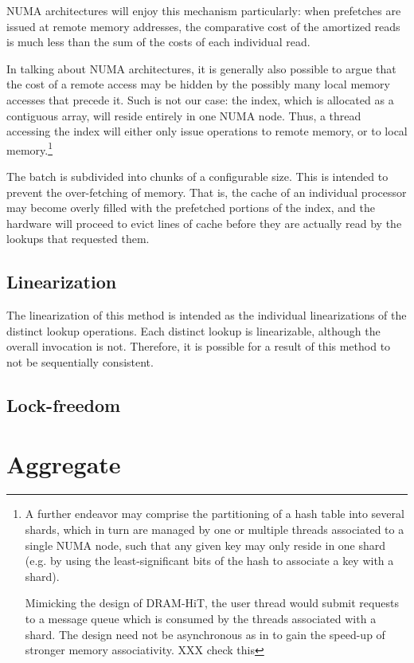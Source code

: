 NUMA architectures will enjoy this mechanism particularly: when prefetches are issued at remote memory addresses, the comparative cost of the amortized reads is much less than the sum of the costs of each individual read.

In talking about NUMA architectures, it is generally also possible to argue that the cost of a remote access may be hidden by the possibly many local memory accesses that precede it.
Such is not our case: the index, which is allocated as a contiguous array, will reside entirely in one NUMA node.
Thus, a thread accessing the index will either only issue operations to remote memory, or to local memory.\footnote{%
	A further endeavor may comprise the partitioning of a hash table into several shards, which in turn are managed by one or multiple threads associated to a single NUMA node, such that any given key may only reside in one shard (e.g. by using the least-significant bits of the hash to associate a key with a shard).
	
	Mimicking the design of DRAM-HiT, the user thread would submit requests to a message queue which is consumed by the threads associated with a shard.
	The design need not be asynchronous as in \cite{dramhit} to gain the speed-up of stronger memory associativity. XXX check this
}

The batch is subdivided into chunks of a configurable size.
This is intended to prevent the over-fetching of memory.
That is, the cache of an individual processor may become overly filled with the prefetched portions of the index, and the hardware will proceed to evict lines of cache before they are actually read by the lookups that requested them.

\subsection{Linearization}

The linearization of this method is intended as the individual linearizations of the distinct lookup operations.
Each distinct lookup is linearizable, although the overall invocation is not.
Therefore, it is possible for a result of this method to not be sequentially consistent.


\subsection{Lock-freedom}

\section{Aggregate}
